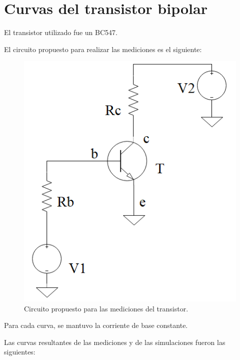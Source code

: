 \documentclass[../../e1_tp1_main.tex]{subfiles}
\begin{document}
\section{Curvas del transistor bipolar}

 El transistor utilizado fue un BC547. \par
 
 
 	El circuito propuesto para realizar las mediciones es el siguiente:
 	
	\begin{figure}[H]	%
		\centering
		\includegraphics[scale=1.2]{imagenes/circuito_transistor.png}
		\caption{Circuito propuesto para las mediciones del transistor.}
		\label{fig:ej5_circuito_transistor}
	\end{figure}
	Para cada curva, se mantuvo la corriente de base constante. \par
	Las curvas resultantes de las mediciones y de las simulaciones fueron las siguientes:	
	
\end{document}
